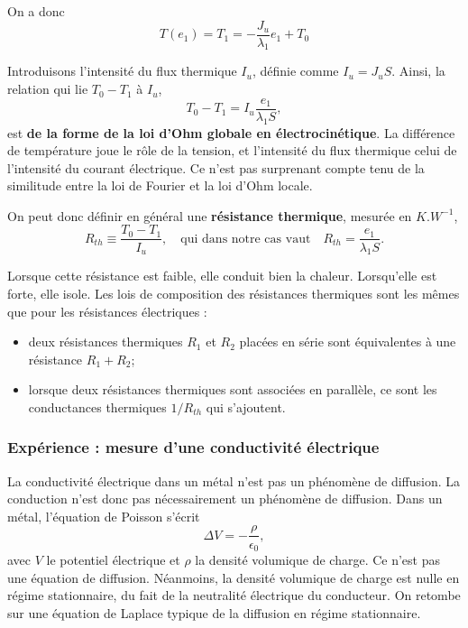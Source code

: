 \documentclass[11pt,a4paper]{report}
\begin{document}
On a donc 
\begin{equation}
	T(e_1) = T_1 = -\frac{J_u}{\lambda_1}e_1 + T_0 
\end{equation}

Introduisons l'intensité du flux thermique $I_u$, définie comme $I_u = J_u S$.
Ainsi, la relation qui lie $T_0 - T_1$ à $I_u$,
\begin{equation}
	T_0 - T_1 = I_u\frac{e_1}{\lambda_1 S},
\end{equation}
est \textbf{de la forme de la loi d'Ohm globale en électrocinétique}. La différence de température joue le rôle de la tension, et l'intensité du flux thermique celui de l'intensité du courant électrique. Ce n'est pas surprenant compte tenu de la similitude entre la loi de Fourier et la loi d'Ohm locale.

On peut donc définir en général une \textbf{résistance thermique}, mesurée en $K.W^{-1}$,
\begin{equation}
	R_{th} \equiv \frac{T_0 - T_1}{I_u},\quad\text{qui dans notre cas vaut}\quad
	R_{th} = \frac{e_1}{\lambda_1 S}.
\end{equation}

Lorsque cette résistance est faible, elle conduit bien la chaleur. Lorsqu'elle est forte, elle isole. Les lois de composition des résistances thermiques sont les mêmes que pour les résistances électriques :
\begin{itemize}
\item deux résistances thermiques $R_1$ et $R_2$ placées en série sont équivalentes à une résistance $R_1 + R_2$;
\item lorsque deux résistances thermiques sont associées en parallèle, ce sont les conductances thermiques $1/R_{th}$ qui s'ajoutent.
\end{itemize}

\subsubsection*{Expérience : mesure d'une conductivité électrique}

La conductivité électrique dans un métal n'est pas un phénomène de diffusion. La conduction n'est donc pas nécessairement un phénomène de diffusion. Dans un métal, l'équation de Poisson s'écrit
\begin{equation}
	\Delta V = -\frac{\rho}{\epsilon_0},
\end{equation}
avec $V$ le potentiel électrique et $\rho$ la densité volumique de charge. Ce n'est pas une équation de diffusion. Néanmoins, la densité volumique de charge est nulle en régime stationnaire, du fait de la neutralité électrique du conducteur. On retombe sur une équation de Laplace typique de la diffusion en régime stationnaire.\\ 
\end{document}
